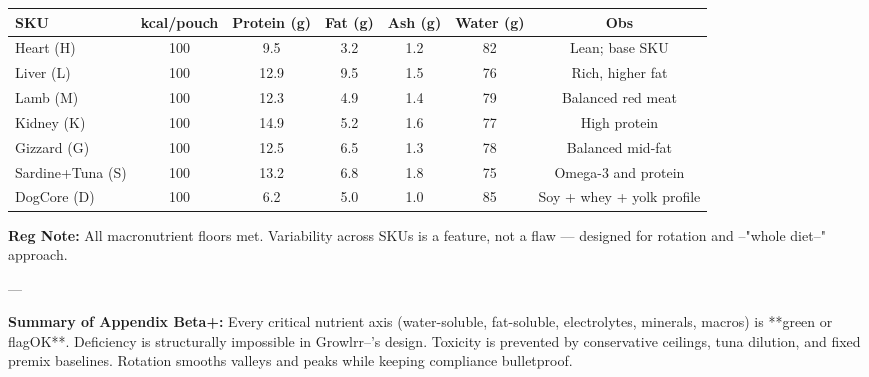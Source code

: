 \begin{center}
\begin{minipage}{\textwidth}
\begin{longtable}{l c c c c c c}
\toprule
SKU & kcal/pouch & Protein (g) & Fat (g) & Ash (g) & Water (g) & Obs \\
\midrule
Heart (H) & 100 & 9.5 & 3.2 & 1.2 & 82 & Lean; base SKU \\
Liver (L) & 100 & 12.9 & 9.5 & 1.5 & 76 & Rich, higher fat \\
Lamb (M) & 100 & 12.3 & 4.9 & 1.4 & 79 & Balanced red meat \\
Kidney (K) & 100 & 14.9 & 5.2 & 1.6 & 77 & High protein \\
Gizzard (G) & 100 & 12.5 & 6.5 & 1.3 & 78 & Balanced mid-fat \\
Sardine+Tuna (S) & 100 & 13.2 & 6.8 & 1.8 & 75 & Omega-3 and protein \\
DogCore (D) & 100 & 6.2 & 5.0 & 1.0 & 85 & Soy + whey + yolk profile \\
\bottomrule
\end{longtable}
\end{minipage}
\end{center}

\noindent\textbf{Reg Note:} All macronutrient floors met. Variability across SKUs is a feature, not a flaw --- designed for rotation and --"whole diet--" approach.  

---

\noindent\textbf{Summary of Appendix Beta+:}  
Every critical nutrient axis (water-soluble, fat-soluble, electrolytes, minerals, macros) is **green or flagOK**. Deficiency is structurally impossible in Growlrr--'s design. Toxicity is prevented by conservative ceilings, tuna dilution, and fixed premix baselines. Rotation smooths valleys and peaks while keeping compliance bulletproof.  

